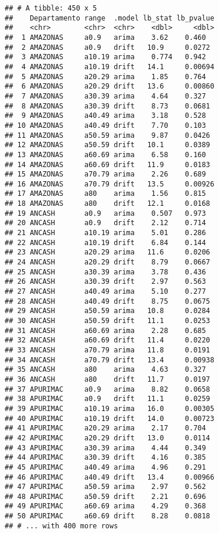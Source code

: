 \documentclass[
]{article}
\begin{document}
\begin{verbatim}
## # A tibble: 450 x 5
##    Departamento range  .model lb_stat lb_pvalue
##    <chr>        <chr>  <chr>    <dbl>     <dbl>
##  1 AMAZONAS     a0.9   arima    3.62    0.460  
##  2 AMAZONAS     a0.9   drift   10.9     0.0272 
##  3 AMAZONAS     a10.19 arima    0.774   0.942  
##  4 AMAZONAS     a10.19 drift   14.1     0.00694
##  5 AMAZONAS     a20.29 arima    1.85    0.764  
##  6 AMAZONAS     a20.29 drift   13.6     0.00860
##  7 AMAZONAS     a30.39 arima    4.64    0.327  
##  8 AMAZONAS     a30.39 drift    8.73    0.0681 
##  9 AMAZONAS     a40.49 arima    3.18    0.528  
## 10 AMAZONAS     a40.49 drift    7.70    0.103  
## 11 AMAZONAS     a50.59 arima    9.87    0.0426 
## 12 AMAZONAS     a50.59 drift   10.1     0.0389 
## 13 AMAZONAS     a60.69 arima    6.58    0.160  
## 14 AMAZONAS     a60.69 drift   11.9     0.0183 
## 15 AMAZONAS     a70.79 arima    2.26    0.689  
## 16 AMAZONAS     a70.79 drift   13.5     0.00926
## 17 AMAZONAS     a80    arima    1.56    0.815  
## 18 AMAZONAS     a80    drift   12.1     0.0168 
## 19 ANCASH       a0.9   arima    0.507   0.973  
## 20 ANCASH       a0.9   drift    2.12    0.714  
## 21 ANCASH       a10.19 arima    5.01    0.286  
## 22 ANCASH       a10.19 drift    6.84    0.144  
## 23 ANCASH       a20.29 arima   11.6     0.0206 
## 24 ANCASH       a20.29 drift    8.79    0.0667 
## 25 ANCASH       a30.39 arima    3.78    0.436  
## 26 ANCASH       a30.39 drift    2.97    0.563  
## 27 ANCASH       a40.49 arima    5.10    0.277  
## 28 ANCASH       a40.49 drift    8.75    0.0675 
## 29 ANCASH       a50.59 arima   10.8     0.0284 
## 30 ANCASH       a50.59 drift   11.1     0.0253 
## 31 ANCASH       a60.69 arima    2.28    0.685  
## 32 ANCASH       a60.69 drift   11.4     0.0220 
## 33 ANCASH       a70.79 arima   11.8     0.0191 
## 34 ANCASH       a70.79 drift   13.4     0.00938
## 35 ANCASH       a80    arima    4.63    0.327  
## 36 ANCASH       a80    drift   11.7     0.0197 
## 37 APURIMAC     a0.9   arima    8.82    0.0658 
## 38 APURIMAC     a0.9   drift   11.1     0.0259 
## 39 APURIMAC     a10.19 arima   16.0     0.00305
## 40 APURIMAC     a10.19 drift   14.0     0.00723
## 41 APURIMAC     a20.29 arima    2.17    0.704  
## 42 APURIMAC     a20.29 drift   13.0     0.0114 
## 43 APURIMAC     a30.39 arima    4.44    0.349  
## 44 APURIMAC     a30.39 drift    4.16    0.385  
## 45 APURIMAC     a40.49 arima    4.96    0.291  
## 46 APURIMAC     a40.49 drift   13.4     0.00966
## 47 APURIMAC     a50.59 arima    2.97    0.562  
## 48 APURIMAC     a50.59 drift    2.21    0.696  
## 49 APURIMAC     a60.69 arima    4.29    0.368  
## 50 APURIMAC     a60.69 drift    8.28    0.0818 
## # ... with 400 more rows
\end{verbatim}
\end{document}
